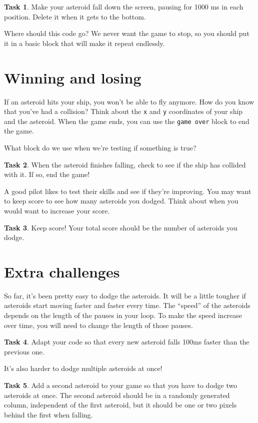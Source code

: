 \documentclass[11pt]{article}
\theoremstyle{definition}
\newtheorem{task}{Task}
\begin{document}
\begin{task}
Make your asteroid fall down the screen, pausing for 1000 ms
in each position. Delete it when it gets to the bottom.
\end{task}

Where should this code go? We never want the game to stop, so you should put it
in a basic block that will make it repeat endlessly.

\section{Winning and losing}
If an asteroid hits your ship, you won't be able to fly anymore. How do you know
that you've had a collision? Think about the \texttt{x} and \texttt{y}
coordinates of your ship and the asteroid. When the game ends, you can use the
\texttt{game over} block to end the game.

What block do we use when we're testing if something is true? 

\begin{task}
When the asteroid finishes falling, check to see if the ship
has collided with it. If so, end the game!
\end{task}

A good pilot likes to test their skills and see if they're improving. You may want to keep score to see how many asteroids you dodged. Think about when you would want to increase your score.

\begin{task}
Keep score! Your total score should be the number of asteroids you dodge.
\end{task}

\section{Extra challenges}

So far, it's been pretty easy to dodge the asteroids. It will be a little
tougher if asteroids start moving faster and faster every time. The ``speed'' of
the asteroids depends on the length of the pauses in your loop. To make the
speed increase over time, you will need to change the length of those pauses.

\begin{task}
Adapt your code so that every new asteroid falls 100ms faster
than the previous one.
\end{task}

It's also harder to dodge multiple asteroids at once! 

\begin{task}
  Add a second asteroid to your game so that you have to dodge two asteroids at
  once. The second asteroid should be in a randomly generated column,
  independent of the first asteroid, but it should be one or two pixels behind
  the first when falling.
\end{task}




\end{document}

